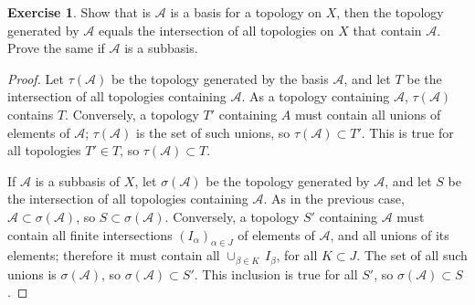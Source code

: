 \documentclass[11pt,a4paper,twoside]{article}
\theoremstyle{definition}
\newcounter{excounter}
\newtheorem{exercise}[excounter]{Exercise}
\begin{document}
\begin{exercise}

  Show that is $\mathscr{A}$ is a basis for a topology on $X$, then the topology generated by $\mathscr{A}$
  equals the intersection of all topologies on $X$ that contain $\mathscr{A}$. Prove the same if $\mathscr{A}$
  is a subbasis.

\end{exercise}

\begin{proof}

  Let $\tau ( \mathscr{A} )$ be the topology generated by the basis $\mathscr{A}$, and let
  $T$ be the intersection of all topologies containing $\mathscr{A}$. As a topology containing
  $\mathscr{A}$, $\tau ( \mathscr{A} )$ contains $T$. Conversely, a topology $T'$ containing $A$
  must contain all unions of elements of $\mathscr{A}$; $\tau ( \mathscr{A} )$ is the set of such unions,
  so $\tau ( \mathscr{A} ) \subset T'$. This is true for all topologies $T' \in T$, so
  $\tau ( \mathscr{A} ) \subset T$.

  If $\mathscr{A}$ is a subbasis of $X$, let $\sigma ( \mathscr{A} )$ be the topology generated by
  $\mathscr{A}$, and let $S$ be the intersection of all topologies containing $\mathscr{A}$.
  As in the previous case, $\mathscr{A} \subset \sigma ( \mathscr{A} )$, so $S \subset \sigma ( \mathscr{A} )$.
  Conversely, a topology $S'$ containing $\mathscr{A}$ must contain all finite intersections $( I_\alpha )_{\alpha \in J}$
  of elements of $\mathscr{A}$, and all unions of its elements; therefore it must contain all
  $\cup_{\beta \in K} \,I_\beta$, for all $K \subset J$. The set of all such unions is $\sigma ( \mathscr{A} )$,
  so $\sigma ( \mathscr{A} ) \subset S'$. This inclusion is true for all $S'$, so $\sigma ( \mathscr{A} ) \subset S$.


\end{proof}
\end{document}
